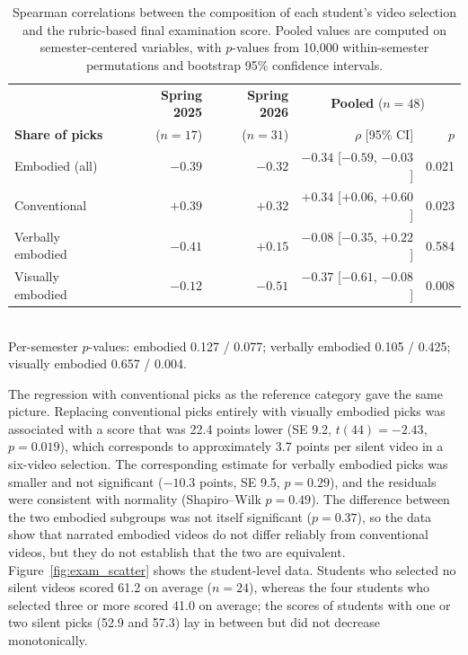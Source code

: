 \documentclass[fleqn,10pt]{JLA_article} %
\begin{document}
\begin{table}[h!]
    \centering
    \caption{Spearman correlations between the composition of each student's video selection and the rubric-based final examination score. Pooled values are computed on semester-centered variables, with $p$-values from 10{,}000 within-semester permutations and bootstrap 95\% confidence intervals.}
    \begin{tabular}{l r r r r}
        \toprule
        & \textbf{Spring 2025} & \textbf{Spring 2026} & \multicolumn{2}{c}{\textbf{Pooled} ($n = 48$)} \\
        \textbf{Share of picks} & ($n = 17$) & ($n = 31$) & $\rho$ [95\% CI] & $p$ \\
        \midrule
        Embodied (all) & $-0.39$ & $-0.32$ & $-0.34$ [$-0.59$, $-0.03$] & 0.021 \\
        Conventional & $+0.39$ & $+0.32$ & $+0.34$ [$+0.06$, $+0.60$] & 0.023 \\
        Verbally embodied & $-0.41$ & $+0.15$ & $-0.08$ [$-0.35$, $+0.22$] & 0.584 \\
        Visually embodied & $-0.12$ & $-0.51$ & $-0.37$ [$-0.61$, $-0.08$] & 0.008 \\
        \bottomrule
    \end{tabular}
    \\[2pt]
    {\footnotesize Per-semester $p$-values: embodied 0.127 / 0.077; verbally embodied 0.105 / 0.425; visually embodied 0.657 / 0.004.}
    \label{tab:exam_corr}
\end{table}

The regression with conventional picks as the reference category gave the same picture. Replacing conventional picks entirely with visually embodied picks was associated with a score that was 22.4 points lower (SE 9.2, $t(44) = -2.43$, $p = 0.019$), which corresponds to approximately 3.7 points per silent video in a six-video selection. The corresponding estimate for verbally embodied picks was smaller and not significant ($-10.3$ points, SE 9.5, $p = 0.29$), and the residuals were consistent with normality (Shapiro--Wilk $p = 0.49$). The difference between the two embodied subgroups was not itself significant ($p = 0.37$), so the data show that narrated embodied videos do not differ reliably from conventional videos, but they do not establish that the two are equivalent. Figure~\ref{fig:exam_scatter} shows the student-level data. Students who selected no silent videos scored 61.2 on average ($n = 24$), whereas the four students who selected three or more scored 41.0 on average; the scores of students with one or two silent picks (52.9 and 57.3) lay in between but did not decrease monotonically.
\end{document}
